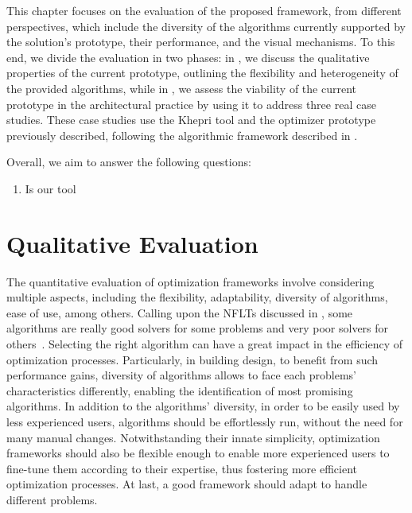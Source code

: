 \cleardoublepage
\label{chap:evaluation}
 
This chapter focuses on the evaluation of the proposed framework, from different perspectives, which include the diversity of the algorithms currently supported by the solution's prototype, their performance, and the visual mechanisms. To this end, we divide the evaluation in two phases: in , we discuss the qualitative properties of the current prototype, outlining the flexibility and heterogeneity of the provided algorithms, while in , we assess the viability of the current prototype in the architectural practice by using it to address three real case studies. These case studies use the Khepri tool and the optimizer prototype previously described, following the algorithmic framework described in .

Overall, we aim to answer the following questions:
\begin{enumerate}
	\item Is our tool 
\end{enumerate}

\section{Qualitative Evaluation}
\label{sec:qualitative}

The quantitative evaluation of optimization frameworks involve considering multiple aspects, including the flexibility, adaptability, diversity of algorithms, ease of use, among others. Calling upon the \acp{NFLT} discussed in , some algorithms are really good solvers for some problems and very poor solvers for others~\cite{Wolpert1997NFLT}. Selecting the right algorithm can have a great impact in the efficiency of optimization processes. Particularly, in building design, to benefit from such performance gains, diversity of algorithms allows to face each problems' characteristics differently, enabling the identification of most promising algorithms. In addition to the algorithms' diversity, in order to be easily used by less experienced users, algorithms should be effortlessly run, without the need for many manual changes. Notwithstanding their innate simplicity, optimization frameworks should also be flexible enough to enable more experienced users to fine-tune them according to their expertise, thus fostering more efficient optimization processes. At last, a good framework should adapt to handle different problems.

